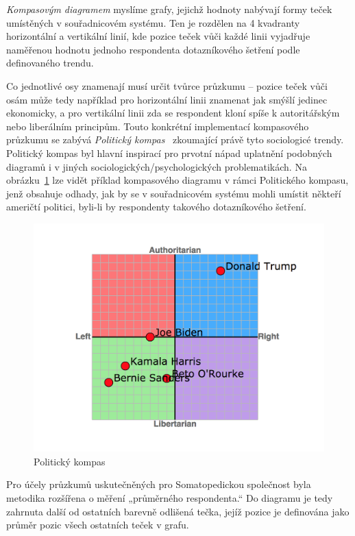 \textit{Kompasovým diagramem} myslíme grafy, jejichž hodnoty nabývají formy teček umístěných v souřadnicovém systému. Ten je rozdělen na 4 kvadranty horizontální a vertikální linií, kde pozice teček vůči každé linii vyjadřuje naměřenou hodnotu jednoho respondenta dotazníkového šetření podle definovaného trendu. 

Co jednotlivé osy znamenají musí určit tvůrce průzkumu – pozice teček vůči osám může tedy například pro horizontální linii znamenat jak smýšlí jedinec ekonomicky, a pro vertikální linii zda se respondent kloní spíše k autoritářským nebo liberálním principům. Touto konkrétní implementací kompasového průzkumu se zabývá \textit{Politický kompas}~\cite{politicalcompass} zkoumající právě tyto sociologicé trendy. Politický kompas byl hlavní inspirací pro prvotní nápad uplatnění podobných diagramů i v jiných sociologických/psychologických problematikách. Na obrázku~\ref{fig:politicalcompass} lze vidět příklad kompasového diagramu v rámci Politického kompasu, jenž obsahuje odhady, jak by se v souřadnicovém systému mohli umístit někteří američtí politici, byli-li by respondenty takového dotazníkového šetření.

\begin{figure}[h!]
  \centering
  \includegraphics[width=\textwidth]{images/politicky_kompas.png}
  \caption{Politický kompas~\cite{politickykompaspng}}
  \label{fig:politicalcompass}
\end{figure}

Pro účely průzkumů uskutečněných pro Somatopedickou společnost byla metodika rozšířena o měření „průměrného respondenta.“ Do diagramu je tedy zahrnuta další od ostatních barevně odlišená tečka, jejíž pozice je definována jako průměr pozic všech ostatních teček v grafu.

